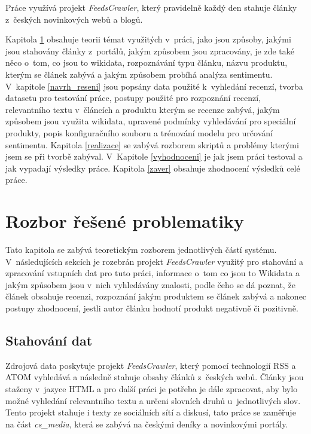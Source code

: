 Práce využívá projekt \textit{FeedsCrawler}, který pravidelně každý den stahuje články z~českých novinkových webů a blogů.

Kapitola \ref{rozbor_resene_problematiky} obsahuje teorii témat využitých v~práci, jako jsou způsoby, jakými jsou stahovány články z~portálů, jakým způsobem jsou zpracovány, je zde také něco o~tom, co jsou to wikidata, rozpoznávání typu článku, názvu produktu, kterým se článek zabývá a jakým způsobem probíhá analýza sentimentu. V~kapitole \ref{navrh_reseni} jsou popsány data použité k~vyhledání recenzí, tvorba datasetu pro testování práce, postupy použité pro rozpoznání recenzí, relevantního textu v~článcích a produktu kterým se recenze zabývá, jakým způsobem jsou využita wikidata, upravené podmínky vyhledávání pro speciální produkty, popis konfiguračního souboru a trénování modelu pro určování sentimentu. Kapitola \ref{realizace} se zabývá rozborem skriptů a problémy kterými jsem se při tvorbě zabýval. V~Kapitole \ref{vyhodnoceni} je jak jsem práci testoval a jak vypadají výsledky práce. Kapitola \ref{zaver} obsahuje zhodnocení výsledků celé práce.

\chapter{Rozbor řešené problematiky}
\label{rozbor_resene_problematiky}
Tato kapitola se zabývá teoretickým rozborem jednotlivých částí systému. V~následujících sekcích je rozebrán projekt \textit{FeedsCrawler} využitý pro stahování a zpracování vstupních dat pro tuto práci, informace o~tom co jsou to Wikidata a jakým způsobem jsou v~nich vyhledávány znalosti, podle čeho se dá poznat, že článek obsahuje recenzi, rozpoznání jakým produktem se článek zabývá a nakonec postupy zhodnocení, jestli autor článku hodnotí produkt negativně či pozitivně.


\section{Stahování dat}
Zdrojová data poskytuje projekt \textit{FeedsCrawler}, který pomocí technologií RSS a ATOM vyhledává a následně stahuje obsahy článků z~českých webů. Články jsou staženy v~jazyce HTML a pro další práci je potřeba je dále zpracovat, aby bylo možné vyhledání relevantního textu a určeni slovních druhů u~jednotlivých slov\cite{FITBT20846}. Tento projekt stahuje i texty ze sociálních sítí a diskusí, tato práce se zaměřuje na část \textit{cs\_media}, která se zabývá na českými deníky a novinkovými portály.


